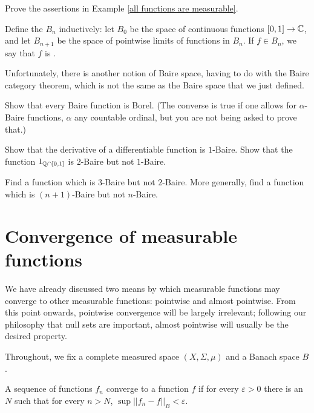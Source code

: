 \begin{exercise}
\label{all functions are measurable exer}
Prove the assertions in Example \ref{all functions are measurable}.
\end{exercise}

\begin{definition}
Define the  $B_n$ inductively: let $B_0$ be the space of continuous functions $[0, 1] \to \mathbb{C}$, and let $B_{n+1}$ be the space of pointwise limits of functions in $B_n$.
If $f \in B_n$, we say that $f$ is .

Unfortunately, there is another notion of Baire space, having to do with the Baire category theorem, which is not the same as the Baire space that we just defined.
\end{definition}

\begin{exercise}
Show that every Baire function is Borel.
(The converse is true if one allows for $\alpha$-Baire functions, $\alpha$ any countable ordinal, but you are not being asked to prove that.)
\end{exercise}

\begin{exercise}
Show that the derivative of a differentiable function is $1$-Baire.
Show that the function $1_{\mathbb{Q} \cap [0, 1]}$ is $2$-Baire but not $1$-Baire.
\end{exercise}

\begin{exercise}
Find a function which is $3$-Baire but not $2$-Baire. More generally, find a function which is $(n+1)$-Baire but not $n$-Baire.
\end{exercise}

\section{Convergence of measurable functions}
We have already discussed two means by which measurable functions may converge to other measurable functions: pointwise and almost pointwise.
From this point onwards, pointwise convergence will be largely irrelevant; following our philosophy that null sets are important, almost pointwise will usually be the desired property.

\begin{subsec}
Throughout, we fix a complete measured space $(X, \Sigma, \mu)$ and a Banach space $B$.
\end{subsec}

\begin{definition}
A sequence of functions $f_n$ converge to a function $f$  if for every $\varepsilon > 0$ there is an $N$ such that for every $n > N$, $\sup ||f_n - f||_B < \varepsilon$.
\end{definition}

